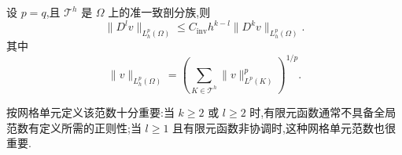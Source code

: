 \begin{corollary}[全局逆估计]\label{cor:appendix-c-32}
设 $p=q$,且 $\mathcal T^h$ 是 $\Omega$ 上的准一致剖分族,则
\begin{equation}\label{eq:appendix-c-37}
 \|D^l v\|_{L^p_h(\Omega)}
 \le C_{\mathrm{inv}}h^{k-l}
       \|D^k v\|_{L^p_h(\Omega)}.
\end{equation}
其中
\[
 \|v\|_{L^p_h(\Omega)}
 =\left(\sum_{K\in\mathcal T^h}\|v\|_{L^p(K)}^p\right)^{1/p}.
\]
\end{corollary}

\begin{note}\label{note:appendix-c-33}
按网格单元定义该范数十分重要:当 $k\ge2$ 或 $l\ge2$ 时,有限元函数通常不具备全局范数有定义所需的正则性;当 $l\ge1$ 且有限元函数非协调时,这种网格单元范数也很重要.
\end{note}
